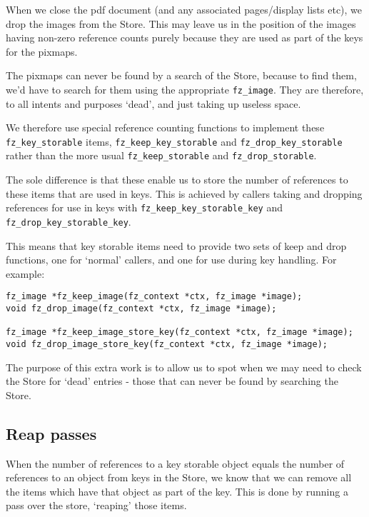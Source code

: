 \documentclass[oneside]{book}
\begin{document}
When we close the pdf document (and any associated pages/display lists etc), we drop the images from the Store. This may leave us in the position of the images having non-zero reference counts purely because they are used as part of the keys for the pixmaps.

The pixmaps can never be found by a search of the Store, because to find them, we'd have to search for them using the appropriate \texttt{fz\_image}. They are therefore, to all intents and purposes `dead', and just taking up useless space.

We therefore use special reference counting functions to implement these \texttt{fz\_key\_storable} items, \texttt{fz\_keep\_key\_storable} and \texttt{fz\_drop\_key\_storable} rather than the more usual \texttt{fz\_keep\_storable} and \texttt{fz\_drop\_storable}.

The sole difference is that these enable us to store the number of references to these items that are used in keys. This is achieved by callers taking and dropping references for use in keys with \texttt{fz\_keep\_key\_storable\_key} and \texttt{fz\_drop\_key\_storable\_key}.

This means that key storable items need to provide two sets of keep and drop functions, one for `normal' callers, and one for use during key handling. For example:

\begin{lstlisting}
fz_image *fz_keep_image(fz_context *ctx, fz_image *image);
void fz_drop_image(fz_context *ctx, fz_image *image);

fz_image *fz_keep_image_store_key(fz_context *ctx, fz_image *image);
void fz_drop_image_store_key(fz_context *ctx, fz_image *image);
\end{lstlisting}

The purpose of this extra work is to allow us to spot when we may need to check the Store for `dead' entries - those that can never be found by searching the Store.

\subsection{Reap passes}

When the number of references to a key storable object equals the number of references to an object from keys in the Store, we know that we can remove all the items which have that object as part of the key. This is done by running a pass over the store, `reaping' those items.
\end{document}
